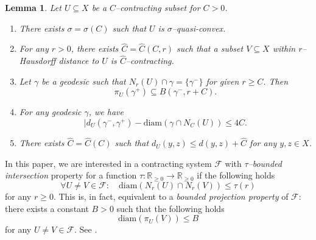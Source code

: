 \documentclass{amsart}
\newtheorem{lem}[thm]{Lemma}
\newtheorem{conv}[thm]{Convention}
\theoremstyle{definition}
\theoremstyle{remark}
\newcommand{\f}{\mathscr F}
\newcommand{\U}{ X}
\begin{document}
\begin{lem}\label{BigFive}
Let $U\subseteq \U$ be a  $C$--contracting subset for $C>0$. 

\begin{enumerate}
\item

There exists $\sigma=\sigma(C)$ such that   $U$ is $\sigma$--quasi-convex. 
\item
For any $r>0$, there exists $\hat C=\hat C(C, r)$ such that a subset $V\subseteq \U$ within $r$--Hausdorff distance to $U$ is $\hat C$--contracting. 


  

\item
Let $\gamma$ be a geodesic  such that $N_r(U)\cap \gamma=\{\gamma^-\}$ for given $r\ge C$. Then $$ \pi_U(\gamma^+)\subseteq B(\gamma^-, r+ C).$$
\item
For any  geodesic $\gamma$, we have $$\big |d_U(\gamma^-,\gamma^+)- \mathrm{diam}(\gamma\cap N_C(U))\leq 4C.$$

\item
There exists $\hat C=\hat C(C)$ such that   $d_U(y, z)\le d(y, z)+\hat C$ for any $y,z\in \U$.

\end{enumerate}
\end{lem}
\fi

 



 
 
 

In this paper, we are interested in a  contracting system $\f$ with  \textit{$\tau$--bounded intersection} property for a function $\tau: \mathbb R_{\ge 0}\to \mathbb R_{\ge 0}$ if the
following holds
$$\forall U\ne  V\in \f: \quad \mathrm{diam}({N_r (U) \cap N_r (V)}) \le \tau(r)$$
for any $r \geq 0$. This  is, in fact, equivalent to a \textit{bounded projection
property} of $\f$:  there exists a constant $B>0$ such that the
following holds
$$\mathrm{diam}(\pi_{U}(V)) \le B$$
for any $U\ne V \in \f$. See \cite[Lemma 2.3]{YANG6}.
\end{document}
